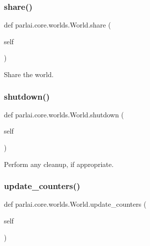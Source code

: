 \subsubsection{\texorpdfstring{share()}{share()}}
{\footnotesize\ttfamily def parlai.\+core.\+worlds.\+World.\+share (\begin{DoxyParamCaption}\item[{}]{self }\end{DoxyParamCaption})}

\begin{DoxyVerb}Share the world.
\end{DoxyVerb}
 \mbox{\label{classparlai_1_1core_1_1worlds_1_1World_a7e7e5a27569323dd334b87df6fef31e6}} 
\subsubsection{\texorpdfstring{shutdown()}{shutdown()}}
{\footnotesize\ttfamily def parlai.\+core.\+worlds.\+World.\+shutdown (\begin{DoxyParamCaption}\item[{}]{self }\end{DoxyParamCaption})}

\begin{DoxyVerb}Perform any cleanup, if appropriate.
\end{DoxyVerb}
 \mbox{\label{classparlai_1_1core_1_1worlds_1_1World_a77730e92a331274ab7b6ea3e7b99d1a4}} 
\subsubsection{\texorpdfstring{update\+\_\+counters()}{update\_counters()}}
{\footnotesize\ttfamily def parlai.\+core.\+worlds.\+World.\+update\+\_\+counters (\begin{DoxyParamCaption}\item[{}]{self }\end{DoxyParamCaption})}

